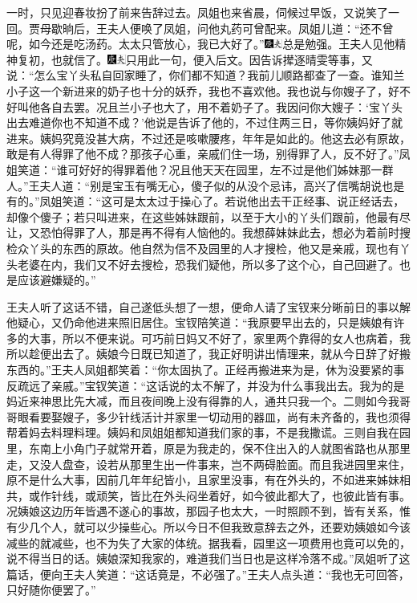 一时，只见迎春妆扮了前来告辞过去。凤姐也来省晨，伺候过早饭，又说笑了一回。贾母歇晌后，王夫人便唤了凤姐，问他丸药可曾配来。凤姐儿道：“还不曾呢，如今还是吃汤药。太太只管放心，我已大好了。”{\includegraphics[width=3mm]{../Images/00004}\includegraphics[width=3mm]{../Images/00012}\footnotesize \kaishu 总是勉强。}王夫人见他精神复初，也就信了。{\includegraphics[width=3mm]{../Images/00004}\includegraphics[width=3mm]{../Images/00012}\footnotesize \kaishu 只用此一句，便入后文。}因告诉撵逐晴雯等事，又说：“怎么宝丫头私自回家睡了，你们都不知道？我前儿顺路都查了一查。谁知兰小子这一个新进来的奶子也十分的妖乔，我也不喜欢他。我也说与你嫂子了，好不好叫他各自去罢。况且兰小子也大了，用不着奶子了。我因问你大嫂子：‘宝丫头出去难道你也不知道不成？’他说是告诉了他的，不过住两三日，等你姨妈好了就进来。姨妈究竟没甚大病，不过还是咳嗽腰疼，年年是如此的。他这去必有原故，敢是有人得罪了他不成？那孩子心重，亲戚们住一场，别得罪了人，反不好了。”凤姐笑道：“谁可好好的得罪着他？况且他天天在园里，左不过是他们姊妹那一群人。”王夫人道：“别是宝玉有嘴无心，傻子似的从没个忌讳，高兴了信嘴胡说也是有的。”凤姐笑道：“这可是太太过于操心了。若说他出去干正经事、说正经话去，却像个傻子；若只叫进来，在这些姊妹跟前，以至于大小的丫头们跟前，他最有尽让，又恐怕得罪了人，那是再不得有人恼他的。我想薛妹妹此去，想必为着前时搜检众丫头的东西的原故。他自然为信不及园里的人才搜检，他又是亲戚，现也有丫头老婆在内，我们又不好去搜检，恐我们疑他，所以多了这个心，自己回避了。也是应该避嫌疑的。”

王夫人听了这话不错，自己遂低头想了一想，便命人请了宝钗来分晰前日的事以解他疑心，又仍命他进来照旧居住。宝钗陪笑道：“我原要早出去的，只是姨娘有许多的大事，所以不便来说。可巧前日妈又不好了，家里两个靠得的女人也病着，我所以趁便出去了。姨娘今日既已知道了，我正好明讲出情理来，就从今日辞了好搬东西的。”王夫人凤姐都笑着：“你太固执了。正经再搬进来为是，休为没要紧的事反疏远了亲戚。”宝钗笑道：“这话说的太不解了，并没为什么事我出去。我为的是妈近来神思比先大减，而且夜间晚上没有得靠的人，通共只我一个。二则如今我哥哥眼看要娶嫂子，多少针线活计并家里一切动用的器皿，尚有未齐备的，我也须得帮着妈去料理料理。姨妈和凤姐姐都知道我们家的事，不是我撒谎。三则自我在园里，东南上小角门子就常开着，原是为我走的，保不住出入的人就图省路也从那里走，又没人盘查，设若从那里生出一件事来，岂不两碍脸面。而且我进园里来住，原不是什么大事，因前几年年纪皆小，且家里没事，有在外头的，不如进来姊妹相共，或作针线，或顽笑，皆比在外头闷坐着好，如今彼此都大了，也彼此皆有事。况姨娘这边历年皆遇不遂心的事故，那园子也太大，一时照顾不到，皆有关系，惟有少几个人，就可以少操些心。所以今日不但我致意辞去之外，还要劝姨娘如今该减些的就减些，也不为失了大家的体统。据我看，园里这一项费用也竟可以免的，说不得当日的话。姨娘深知我家的，难道我们当日也是这样冷落不成。”凤姐听了这篇话，便向王夫人笑道：“这话竟是，不必强了。”王夫人点头道：“我也无可回答，只好随你便罢了。”

